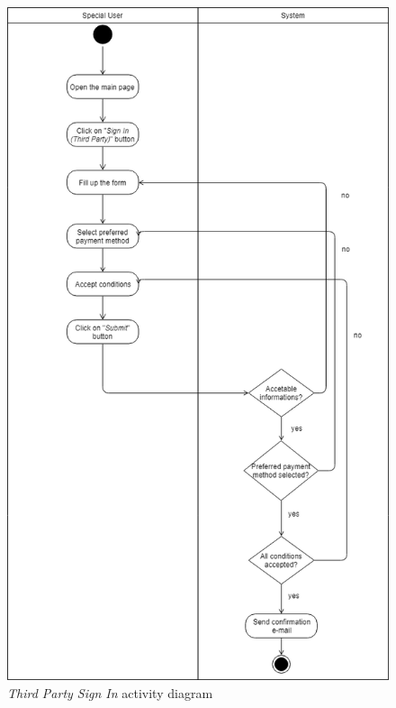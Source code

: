 \begin{figure}[H]
\begin{center}
  \includegraphics[height=0.6\paperheight]{img/activity/SpecialSignIn.png}
  \hspace{0.05\linewidth}
  \centering
  \caption{\textit{Third Party Sign In} activity diagram}
  \label{img:specialSignInActivityDiagram}
\end{center}
\end{figure}


